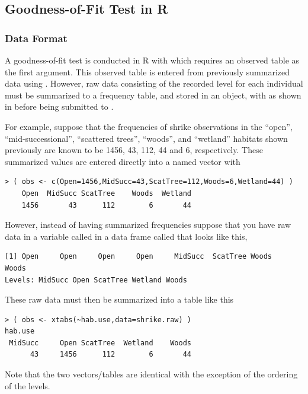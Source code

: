 \documentclass[10pt,openany]{book}\usepackage[]{graphicx}\usepackage[]{color}
\makeatletter
\newenvironment{kframe}{%
 \def\at@end@of@kframe{}%
 \ifinner\ifhmode%
  \def\at@end@of@kframe{\end{minipage}}%
  \begin{minipage}{\columnwidth}%
 \fi\fi%
 \def\FrameCommand##1{\hskip\@totalleftmargin \hskip-\fboxsep
 \colorbox{shadecolor}{##1}\hskip-\fboxsep
     \hskip-\linewidth \hskip-\@totalleftmargin \hskip\columnwidth}%
 \MakeFramed {\advance\hsize-\width
   \@totalleftmargin\z@ \linewidth\hsize
   \@setminipage}}%
 {\par\unskip\endMakeFramed%
 \at@end@of@kframe}
\newenvironment{knitrout}{}{} %
\makeatother
\begin{document}
\subsection{Goodness-of-Fit Test in R}
\subsubsection{Data Format}
A goodness-of-fit test is conducted in R with  which requires an observed table as the first argument.  This observed table is entered from previously summarized data using .  However, raw data consisting of the recorded level for each individual must be summarized to a frequency table, and stored in an object, with  as shown in  before being submitted to .

For example, suppose that the frequencies of shrike observations in the ``open'', ``mid-successional'', ``scattered trees'', ``woods'', and ``wetland'' habitats shown previously are known to be 1456, 43, 112, 44 and 6, respectively.  These summarized values are entered directly into a named vector with
\begin{knitrout}
\color{fgcolor}\begin{kframe}
\begin{verbatim}
> ( obs <- c(Open=1456,MidSucc=43,ScatTree=112,Woods=6,Wetland=44) )
    Open  MidSucc ScatTree    Woods  Wetland 
    1456       43      112        6       44 
\end{verbatim}
\end{kframe}
\end{knitrout}

However, instead of having summarized frequencies suppose that you have raw data in a variable called  in a data frame called  that looks like this,
\begin{knitrout}
\color{fgcolor}\begin{kframe}
\begin{verbatim}
[1] Open     Open     Open     Open     MidSucc  ScatTree Woods    Woods   
Levels: MidSucc Open ScatTree Wetland Woods
\end{verbatim}
\end{kframe}
\end{knitrout}
These raw data must then be summarized into a table like this
\begin{knitrout}
\color{fgcolor}\begin{kframe}
\begin{verbatim}
> ( obs <- xtabs(~hab.use,data=shrike.raw) )
hab.use
 MidSucc     Open ScatTree  Wetland    Woods 
      43     1456      112        6       44 
\end{verbatim}
\end{kframe}
\end{knitrout}
Note that the two vectors/tables are identical with the exception of the ordering of the levels.
\end{document}
